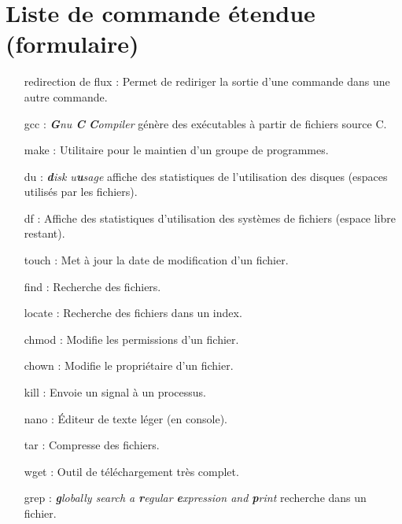 \documentclass[french, a4paper, 12pt, titlepage]{article}
\begin{document}
\section{Liste de commande étendue (formulaire)}
\begin{enumerate}
	\item[redirection de flux]: Permet de rediriger la sortie d'une commande
		dans une autre commande.
	\item[gcc]: \emph{\textbf{G}nu \textbf{C} \textbf{C}ompiler}  génère des
		exécutables à partir de fichiers source C.
	\item[make]: Utilitaire pour le maintien d'un groupe de programmes.
	\item[du]: \emph{\textbf{d}isk u\textbf{u}sage} affiche des statistiques de
		l'utilisation des disques (espaces utilisés par les fichiers).
	\item[df]: Affiche des statistiques d'utilisation des systèmes de fichiers
		(espace libre restant).
	\item[touch]: Met à jour la date de modification d'un fichier.
	\item[find]: Recherche des fichiers.
	\item[locate]: Recherche des fichiers dans un index.
	\item[chmod]: Modifie les permissions d'un fichier.
	\item[chown]: Modifie le propriétaire d'un fichier.
	\item[kill]: Envoie un signal à un processus.
	\item[nano]: Éditeur de texte léger (en console).
	\item[tar]: Compresse des fichiers.
	\item[wget]: Outil de téléchargement très complet.
	\item[grep]: \emph{\textbf{g}lobally search a \textbf{r}egular
			\textbf{e}xpression and \textbf{p}rint} recherche dans un fichier.
\end{enumerate}













\end{document}
